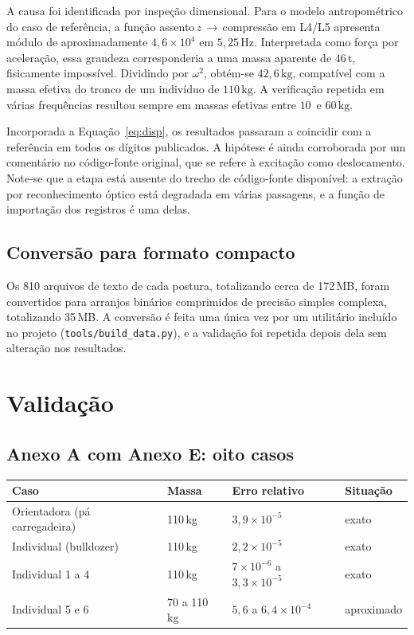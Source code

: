 \documentclass[11pt,a4paper]{article}
\newcommand{\code}[1]{\texttt{\small #1}}
\newcommand{\unit}[2]{\ensuremath{#1\,\mathrm{#2}}}
\begin{document}
A causa foi identificada por inspeção dimensional. Para o modelo antropométrico
do caso de referência, a função assento\,$z$\,$\rightarrow$\,compressão em L4/L5
apresenta módulo de aproximadamente $4{,}6\times10^{4}$ em \unit{5{,}25}{Hz}.
Interpretada como força por aceleração, essa grandeza corresponderia a uma massa
aparente de \unit{46}{t}, fisicamente impossível. Dividindo por $\omega^2$,
obtém-se \unit{42{,}6}{kg}, compatível com a massa efetiva do tronco de um
indivíduo de \unit{110}{kg}. A verificação repetida em várias frequências
resultou sempre em massas efetivas entre \unit{10}{} e \unit{60}{kg}.

Incorporada a Equação~\eqref{eq:disp}, os resultados passaram a coincidir com a
referência em todos os dígitos publicados. A hipótese é ainda corroborada por um
comentário no código-fonte original, que se refere à excitação como
deslocamento. Note-se que a etapa está ausente do trecho de código-fonte
disponível: a extração por reconhecimento óptico está degradada em várias
passagens, e a função de importação dos registros é uma delas.

\subsection{Conversão para formato compacto}

Os 810 arquivos de texto de cada postura, totalizando cerca de 172\,MB, foram
convertidos para arranjos binários comprimidos de precisão simples complexa,
totalizando 35\,MB. A conversão é feita uma única vez por um utilitário incluído
no projeto (\code{tools/build\_data.py}), e a validação foi repetida depois dela
sem alteração nos resultados.

\section{Validação}

\subsection{Anexo A com Anexo E: oito casos}

\begin{center}
\begin{tabular}{llll}
\toprule
\textbf{Caso} & \textbf{Massa} & \textbf{Erro relativo} & \textbf{Situação} \\
\midrule
Orientadora (pá carregadeira) & 110\,kg & $3{,}9\times10^{-5}$ & exato \\
Individual (bulldozer)        & 110\,kg & $2{,}2\times10^{-5}$ & exato \\
Individual 1 a 4              & 110\,kg & $7\times10^{-6}$ a $3{,}3\times10^{-5}$ & exato \\
Individual 5 e 6              & 70 a 110\,kg & $5{,}6$ a $6{,}4\times10^{-4}$ & aproximado \\
\bottomrule
\end{tabular}
\end{center}
\end{document}
